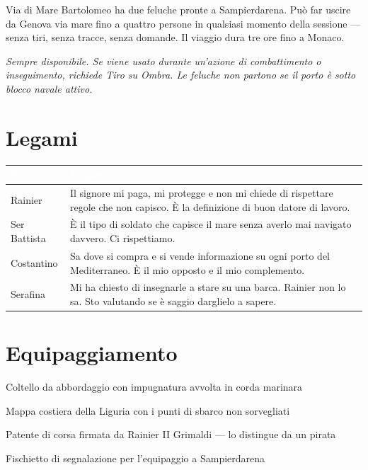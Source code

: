 
\begin{grimaldibox}{Via di Mare}
  Bartolomeo ha due feluche pronte a Sampierdarena. Può far uscire da Genova
  via mare fino a quattro persone in qualsiasi momento della sessione —
  senza tiri, senza tracce, senza domande. Il viaggio dura tre ore fino
  a Monaco.

  \medskip\noindent\textit{Sempre disponibile. Se viene usato durante
  un'azione di combattimento o inseguimento, richiede Tiro su Ombra.
  Le feluche non partono se il porto è sotto blocco navale attivo.}
\end{grimaldibox}

\section*{Legami}

\begin{table}[h]
\centering\renewcommand{\arraystretch}{1.4}
\begin{tabularx}{\linewidth}{@{}L{2.6cm} X@{}}
  \toprule{}
  \textcolor{white}{\textbf{PG}} & \textcolor{white}{\textbf{Legame}} \\
  \midrule
  Rainier & Il signore mi paga, mi protegge e non mi chiede di rispettare
           regole che non capisco. È la definizione di buon datore di lavoro. \\
  Ser Battista & È il tipo di soldato che capisce il mare senza averlo mai
                navigato davvero. Ci rispettiamo. \\
  Costantino & Sa dove si compra e si vende informazione su ogni porto
              del Mediterraneo. È il mio opposto e il mio complemento. \\
  Serafina & Mi ha chiesto di insegnarle a stare su una barca. Rainier non
            lo sa. Sto valutando se è saggio darglielo a sapere. \\
  \bottomrule
\end{tabularx}
\end{table}

\section*{Equipaggiamento}
\begin{goldlist}
  \item Coltello da abbordaggio con impugnatura avvolta in corda marinara
  \item Mappa costiera della Liguria con i punti di sbarco non sorvegliati
  \item Patente di corsa firmata da Rainier II Grimaldi — lo distingue da un pirata
  \item Fischietto di segnalazione per l'equipaggio a Sampierdarena
\end{goldlist}

